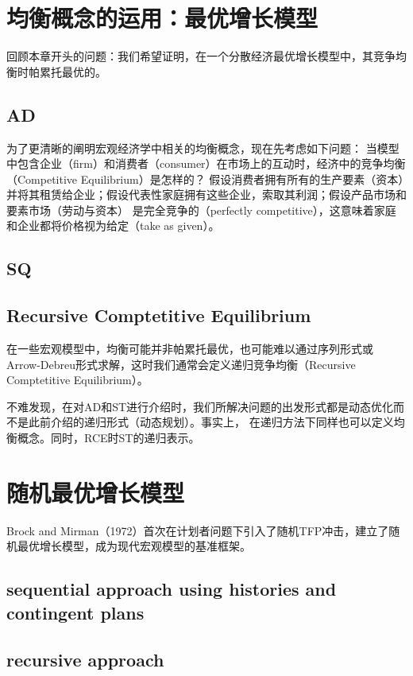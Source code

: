 \section{均衡概念的运用：最优增长模型}

回顾本章开头的问题：我们希望证明，在一个分散经济最优增长模型中，其竞争均衡时帕累托最优的。



\subsection{AD}

为了更清晰的阐明宏观经济学中相关的均衡概念，现在先考虑如下问题：
当模型中包含企业（firm）和消费者（consumer）在市场上的互动时，经济中的竞争均衡（Competitive Equilibrium）是怎样的？
假设消费者拥有所有的生产要素（资本）并将其租赁给企业；假设代表性家庭拥有这些企业，索取其利润；假设产品市场和要素市场（劳动与资本）
是完全竞争的（perfectly competitive），这意味着家庭和企业都将价格视为给定（take as given）。


\subsection{SQ}


\subsection{Recursive Comptetitive Equilibrium}

在一些宏观模型中，均衡可能并非帕累托最优，也可能难以通过序列形式或Arrow-Debreu形式求解，这时我们通常会定义递归竞争均衡（Recursive Comptetitive Equilibrium）。

不难发现，在对AD和ST进行介绍时，我们所解决问题的出发形式都是动态优化而不是此前介绍的递归形式（动态规划）。事实上，
在递归方法下同样也可以定义均衡概念。同时，RCE时ST的递归表示。





\section{随机最优增长模型}

Brock and Mirman（1972）首次在计划者问题下引入了随机TFP冲击，建立了随机最优增长模型，成为现代宏观模型的基准框架。


\subsection{sequential approach using histories and contingent plans}


\subsection{recursive approach}

